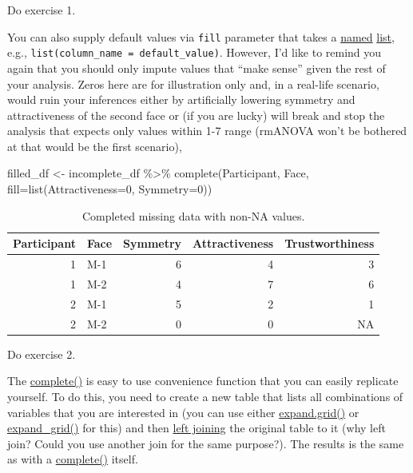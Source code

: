\documentclass[
]{book}
\newenvironment{Shaded}{\begin{snugshade}}{\end{snugshade}}
\newcommand{\AttributeTok}[1]{\textcolor[rgb]{0.77,0.63,0.00}{#1}}
\newcommand{\DecValTok}[1]{\textcolor[rgb]{0.00,0.00,0.81}{#1}}
\newcommand{\FunctionTok}[1]{\textcolor[rgb]{0.00,0.00,0.00}{#1}}
\newcommand{\NormalTok}[1]{#1}
\newcommand{\OtherTok}[1]{\textcolor[rgb]{0.56,0.35,0.01}{#1}}
\newcommand{\SpecialCharTok}[1]{\textcolor[rgb]{0.00,0.00,0.00}{#1}}
\begin{document}
Do exercise 1.

You can also supply default values via \texttt{fill} parameter that takes a \protect\hyperlink{names}{named} \protect\hyperlink{lists}{list}, e.g., \texttt{list(column\_name\ =\ default\_value)}. However, I'd like to remind you again that you should only impute values that ``make sense'' given the rest of your analysis. Zeros here are for illustration only and, in a real-life scenario, would ruin your inferences either by artificially lowering symmetry and attractiveness of the second face or (if you are lucky) will break and stop the analysis that expects only values within 1-7 range (rmANOVA won't be bothered at that would be the first scenario),

\begin{Shaded}
\begin{Highlighting}[]
\NormalTok{filled\_df }\OtherTok{\textless{}{-}} 
\NormalTok{  incomplete\_df }\SpecialCharTok{\%\textgreater{}\%}
  \FunctionTok{complete}\NormalTok{(Participant, Face, }\AttributeTok{fill=}\FunctionTok{list}\NormalTok{(}\AttributeTok{Attractiveness=}\DecValTok{0}\NormalTok{, }\AttributeTok{Symmetry=}\DecValTok{0}\NormalTok{))}
\end{Highlighting}
\end{Shaded}

\begin{table}

\caption{\label{tab:unnamed-chunk-280}Completed missing data with non-NA values.}
\centering
\begin{tabular}[t]{r|l|r|r|r}
\hline
Participant & Face & Symmetry & Attractiveness & Trustworthiness\\
\hline
1 & M-1 & 6 & 4 & 3\\
\hline
1 & M-2 & 4 & 7 & 6\\
\hline
2 & M-1 & 5 & 2 & 1\\
\hline
2 & M-2 & 0 & 0 & NA\\
\hline
\end{tabular}
\end{table}

Do exercise 2.

The \href{https://tidyr.tidyverse.org/reference/complete.html}{complete()} is easy to use convenience function that you can easily replicate yourself. To do this, you need to create a new table that lists all combinations of variables that you are interested in (you can use either \href{https://stat.ethz.ch/R-manual/R-devel/library/base/html/expand.grid.html}{expand.grid()} or \href{https://tidyr.tidyverse.org/reference/expand_grid.html}{expand\_grid()} for this) and then \protect\hyperlink{joins}{left joining} the original table to it (why left join? Could you use another join for the same purpose?). The results is the same as with a \href{https://tidyr.tidyverse.org/reference/complete.html}{complete()} itself.
\end{document}
